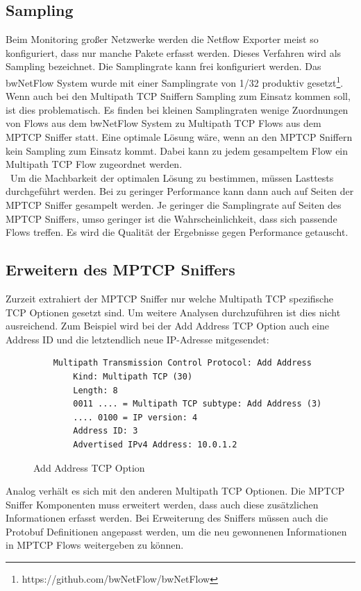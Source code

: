 \documentclass[a4paper, 12pt]{article}
\begin{document}
\subsection{Sampling}
Beim Monitoring großer Netzwerke werden die Netflow Exporter meist so konfiguriert, dass nur manche Pakete erfasst werden.
Dieses Verfahren wird als Sampling bezeichnet.
Die Samplingrate kann frei konfiguriert werden.
Das bwNetFlow System wurde mit einer Samplingrate von 1/32 produktiv gesetzt\footnote{https://github.com/bwNetFlow/bwNetFlow}.
\\
Wenn auch bei den  Multipath TCP Sniffern Sampling zum Einsatz kommen soll, ist dies problematisch.
Es finden bei kleinen Samplingraten wenige Zuordnungen von Flows aus dem bwNetFlow System zu Multipath TCP Flows aus dem MPTCP Sniffer statt.
Eine optimale Lösung wäre, wenn an den MPTCP Sniffern kein Sampling zum Einsatz kommt.
Dabei kann zu jedem gesampeltem Flow ein Multipath TCP Flow zugeordnet werden.
\\\
Um die Machbarkeit der optimalen Lösung zu bestimmen, müssen Lasttests durchgeführt werden. 
Bei zu geringer Performance kann dann auch auf Seiten der MPTCP Sniffer gesampelt werden.
Je geringer die Samplingrate auf Seiten des MPTCP Sniffers, umso geringer ist die Wahrscheinlichkeit, dass sich passende Flows treffen. 
Es wird die Qualität der Ergebnisse gegen Performance getauscht.


\subsection{Erweitern des MPTCP Sniffers}
Zurzeit extrahiert der MPTCP Sniffer nur welche Multipath TCP spezifische TCP Optionen gesetzt sind.
Um weitere Analysen durchzuführen ist dies nicht ausreichend. 
Zum Beispiel wird bei der Add Address TCP Option auch eine Address ID und die letztendlich neue IP-Adresse mitgesendet:
\begin{figure}[H]
\begin{lstlisting}
    Multipath Transmission Control Protocol: Add Address
        Kind: Multipath TCP (30)
        Length: 8
        0011 .... = Multipath TCP subtype: Add Address (3)
        .... 0100 = IP version: 4
        Address ID: 3
        Advertised IPv4 Address: 10.0.1.2
\end{lstlisting}
\caption{Add Address TCP Option}
\end{figure}

Analog verhält es sich mit den anderen Multipath TCP Optionen.
Die MPTCP Sniffer Komponenten muss erweitert werden, dass auch diese zusätzlichen Informationen erfasst werden.
Bei Erweiterung des Sniffers müssen auch die Protobuf Definitionen angepasst werden, um die neu gewonnenen Informationen in MPTCP Flows weitergeben zu können.
\end{document}
